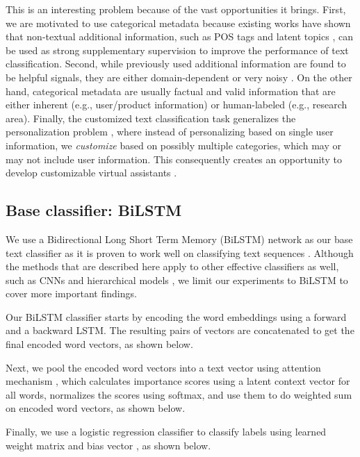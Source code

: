 \documentclass[11pt,a4paper]{article}
\begin{document}
This is an interesting problem because of the vast opportunities it brings. First, we are motivated to use categorical metadata because existing works have shown that non-textual additional information, such as POS tags \cite{go2009twitter} and latent topics \cite{zhao2017topic}, can be used as strong supplementary supervision to improve the performance of text classification. Second, while previously used additional information are found to be helpful signals, they are either domain-dependent or very noisy \cite{amplayo2018translations}. On the other hand, categorical metadata are usually factual and valid information that are either inherent (e.g., user/product information) or human-labeled (e.g., research area). Finally, the customized text classification task generalizes the personalization problem \cite{baruzzo2009general}, where instead of personalizing based on single user information, we \textit{customize} based on possibly multiple categories, which may or may not include user information. This consequently creates an opportunity to develop customizable virtual assistants \cite{papacharissi2002presentation}.

\subsection{Base classifier: \mbox{BiLSTM}}

We use a Bidirectional Long Short Term Memory (\mbox{BiLSTM}) network \cite{hochreiter1997long} as our base text classifier as it is proven to work well on classifying text sequences \cite{zhou2016text}. Although the methods that are described here apply to other effective classifiers as well, such as CNNs \cite{kim2014convolutional} and hierarchical models \cite{yang2016hierarchical}, we limit our experiments to \mbox{BiLSTM} to cover more important findings.

Our \mbox{BiLSTM} classifier starts by encoding the word embeddings using a forward and a backward \mbox{LSTM}. The resulting pairs of vectors are concatenated to get the final encoded word vectors, as shown below.

Next, we pool the encoded word vectors  into a text vector  using attention mechanism \cite{bahdanau2014neural,luong2015effective}, which calculates importance scores using a latent context vector  for all words, normalizes the scores using softmax, and use them to do weighted sum on encoded word vectors, as shown below.

Finally, we use a logistic regression classifier to classify labels using learned weight matrix  and bias vector , as shown below. 
\end{document}
